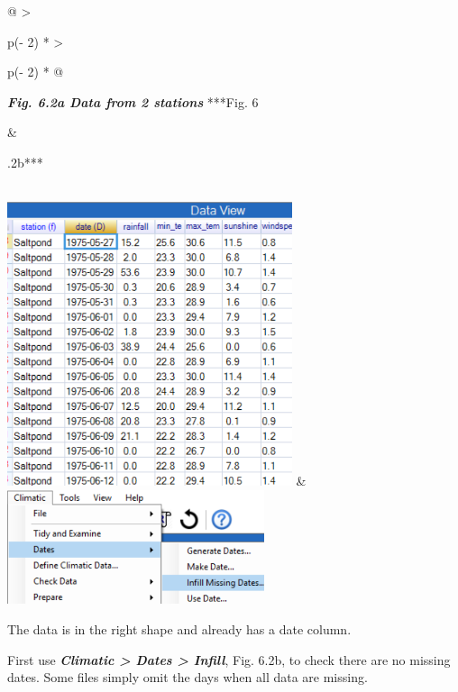 \documentclass[
  letterpaper,
  DIV=11,
  numbers=noendperiod]{scrreprt}
\begin{document}
\begin{longtable}[]{@{}
  >{\raggedright\arraybackslash}p{(\columnwidth - 2\tabcolsep) * }
  >{\raggedright\arraybackslash}p{(\columnwidth - 2\tabcolsep) * }@{}}
\toprule\noalign{}
\begin{minipage}[b]{\linewidth}\raggedright
\textbf{\emph{Fig. 6.2a Data from 2 stations}} ***Fig. 6
\end{minipage} & \begin{minipage}[b]{\linewidth}\raggedright
.2b***
\end{minipage} \\
\midrule\noalign{}
\endhead
\bottomrule\noalign{}
\endlastfoot
\includegraphics[width=3.29027in,height=3.28453in]{figures/Fig6.2a.png}
&
\includegraphics[width=2.96822in,height=1.31673in]{figures/Fig6.2b.png} \\
\end{longtable}

The data is in the right shape and already has a date column.

First use \textbf{\emph{Climatic \textgreater{} Dates \textgreater{}
Infill}}, Fig. 6.2b, to check there are no missing dates. Some files
simply omit the days when all data are missing.
\end{document}
